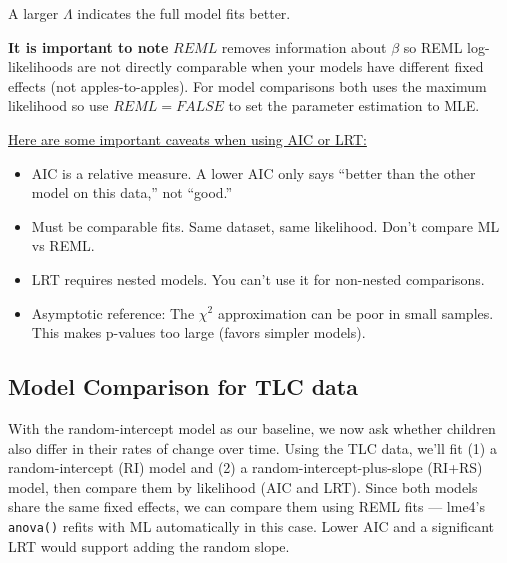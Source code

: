 \documentclass[
  letterpaper,
  DIV=11,
  numbers=noendperiod]{scrreprt}
\begin{document}
A larger \(\Lambda\) indicates the full model fits better.

\textbf{It is important to note} \(REML\) removes information about
\(\beta\) so REML log-likelihoods are not directly comparable when your
models have different fixed effects (not apples-to-apples). For model
comparisons both uses the maximum likelihood so use \(REML=FALSE\) to
set the parameter estimation to MLE.

\ul{Here are some important caveats when using AIC or LRT:}

\begin{itemize}
\item
  AIC is a relative measure. A lower AIC only says ``better than the
  other model on this data,'' not ``good.''
\item
  Must be comparable fits. Same dataset, same likelihood. Don't compare
  ML vs REML.
\item
  LRT requires nested models. You can't use it for non-nested
  comparisons.
\item
  Asymptotic reference: The \(\chi^2\) approximation can be poor in
  small samples. This makes p-values too large (favors simpler models).
\end{itemize}

\hypertarget{model-comparison-for-tlc-data}{%
\subsection*{Model Comparison for TLC
data}\label{model-comparison-for-tlc-data}}

With the random-intercept model as our baseline, we now ask whether
children also differ in their rates of change over time. Using the TLC
data, we'll fit (1) a random-intercept (RI) model and (2) a
random-intercept-plus-slope (RI+RS) model, then compare them by
likelihood (AIC and LRT). Since both models share the same fixed
effects, we can compare them using REML fits --- lme4's \texttt{anova()}
refits with ML automatically in this case. Lower AIC and a significant
LRT would support adding the random slope.
\end{document}
